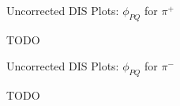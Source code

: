 \begin{frame}{Uncorrected DIS Plots: $\phi_{PQ}$ for $\pi^+$}
    \label{20.10g::phipq_pi+}

    TODO

\end{frame}

\begin{frame}{Uncorrected DIS Plots: $\phi_{PQ}$ for $\pi^-$}
    \label{20.10h::phipq_pi-}

    TODO

\end{frame}
